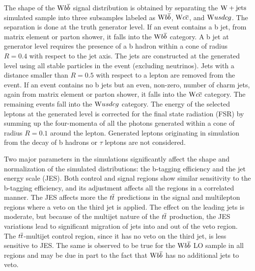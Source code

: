 The shape of the $\mathrm{W} b\overline{b}$ signal distribution is obtained by separating
 the $\mathrm{W}+\mathrm{jets}$ simulated sample into three subsamples labeled as $\mathrm{W} b\overline{b}$, $\mathrm{W} c\overline{c}$, and $\mathrm{W} usdcg$.
The separation is done at the truth generator level.
If an event contains a b jet, from matrix element or parton shower,
 it falls into the $\mathrm{W} b\overline{b}$ category.
A b jet at generator level requires
 the presence of a b hadron within a cone of
 radius $R=0.4$ with respect to the jet axis.
The jets are constructed at the generated level using
 all stable particles in the event (excluding neutrinos).
Jets with a distance smaller than $R = 0.5$ with respect to a
 lepton are removed from the event.
If an event contains no b jets but
 an even, non-zero, number of charm jets,
 again from matrix element or
 parton shower, it falls into the $\mathrm{W} c\overline{c}$ category.
The remaining events fall into the $\mathrm{W} usdcg$ category.
The energy of the selected leptons at the generated level is corrected
 for the final state radiation (FSR) by summing up
 the four-momenta of
 all the photons generated within a cone of radius $R = 0.1$
 around the lepton.
Generated leptons originating in simulation from the decay of b hadrons or $\tau$ leptons
 are not considered.


%

Two major parameters in the simulations
 significantly affect the shape and
 normalization of the simulated distributions:
 the b-tagging efficiency and the jet energy scale (JES).
Both control and signal regions show similar
 sensitivity to the b-tagging efficiency,
 and its adjustment affects all the regions
 in a correlated manner.
The JES affects more the $t\overline{t}$ predictions
 in the signal and multilepton regions where a veto
 on the third jet is applied.
The effect on the leading jets is moderate,
 but because of the multijet nature of the $t\overline{t}$ production,
 the JES variations lead to significant migration of jets
 into and out of the veto region.
The $t\overline{t}$-multijet control region,
 since it has no veto on the third jet,
 is less sensitive to JES.
The same is observed to be true for the $\mathrm{W} b\overline{b}$ LO sample
 in all regions and may be due in part to the fact that
 $\mathrm{W} b\overline{b}$ has no additional jets to veto.

